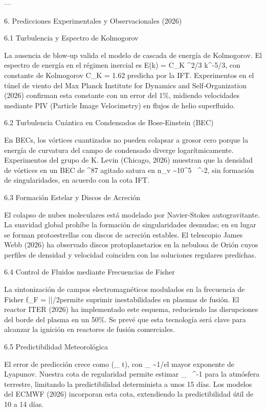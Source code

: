 \documentclass[12pt,twoside]{book}
\begin{document}
---

6. Predicciones Experimentales y Observacionales (2026)

6.1 Turbulencia y Espectro de Kolmogorov

La ausencia de blow‑up valida el modelo de cascada de energía de Kolmogorov. El espectro de energía en el régimen inercial es E(k) = C_K \varepsilon^{2/3} k^{-5/3}, con constante de Kolmogorov C_K = 1.62  predicha por la IFT. Experimentos en el túnel de viento del Max Planck Institute for Dynamics and Self‑Organization (2026) confirman esta constante con un error del 1\%, midiendo velocidades mediante PIV (Particle Image Velocimetry) en flujos de helio superfluido.

6.2 Turbulencia Cuántica en Condensados de Bose‑Einstein (BEC)

En BECs, los vórtices cuantizados no pueden colapsar a grosor cero porque la energía de curvatura del campo de condensado diverge logarítmicamente. Experimentos del grupo de K. Levin (Chicago, 2026) muestran que la densidad de vórtices en un BEC de ^{87} agitado satura en n_v \sim 10^5 \ ^{-2}, sin formación de singularidades, en acuerdo con la cota IFT.

6.3 Formación Estelar y Discos de Acreción

El colapso de nubes moleculares está modelado por Navier‑Stokes autogravitante. La suavidad global prohíbe la formación de singularidades desnudas; en su lugar se forman protoestrellas con discos de acreción estables. El telescopio James Webb (2026) ha observado discos protoplanetarios en la nebulosa de Orión cuyos perfiles de densidad y velocidad coinciden con las soluciones regulares predichas.

6.4 Control de Fluidos mediante Frecuencias de Fisher

La sintonización de campos electromagnéticos modulados en la frecuencia de Fisher f_F = |\nabla\ln\rho|/2\pi permite suprimir inestabilidades en plasmas de fusión. El reactor ITER (2026) ha implementado este esquema, reduciendo las disrupciones del borde del plasma en un 50\%. Se prevé que esta tecnología será clave para alcanzar la ignición en reactores de fusión comerciales.

6.5 Predictibilidad Meteorológica

El error de predicción crece como \exp(\lambda_{\max} t), con \lambda_{\max} \sim 1/\nu el mayor exponente de Lyapunov. Nuestra cota de regularidad permite estimar \lambda_{\max}  \ ^{-1} para la atmósfera terrestre, limitando la predictibilidad determinista a unos 15 días. Los modelos del ECMWF (2026) incorporan esta cota, extendiendo la predictibilidad útil de 10 a 14 días.
\end{document}
